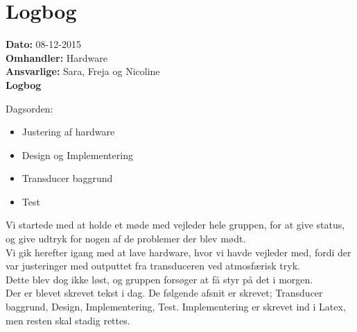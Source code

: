 \section{Logbog}

\textbf{Dato:} 08-12-2015 \\
\textbf{Omhandler:} Hardware \\
\textbf{Ansvarlige:} Sara, Freja og Nicoline \\
\textbf{Logbog}

Dagsorden:
\begin{itemize}
	\item Justering af hardware
	\item Design og Implementering
	\item Transducer baggrund
	\item Test
\end{itemize}

Vi startede med at holde et møde med vejleder hele gruppen, for at give status, og give udtryk for nogen af de problemer der blev mødt. \\
Vi gik herefter igang med at lave hardware, hvor vi havde vejleder med, fordi der var justeringer med outputtet fra transduceren ved atmosfærisk tryk. \\
Dette blev dog ikke løst, og gruppen forsøger at få styr på det i morgen.\\
Der er blevet skrevet tekst i dag. De følgende afsnit er skrevet; Transducer baggrund, Design, Implementering, Test. Implementering er skrevet ind i Latex, men resten skal stadig rettes. 